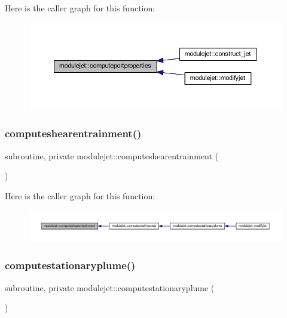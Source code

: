 Here is the caller graph for this function\+:\nopagebreak
\begin{figure}[H]
\begin{center}
\leavevmode
\includegraphics[width=350pt]{namespacemodulejet_a6a2424bc396ad0eed996ed0d75430e3b_icgraph}
\end{center}
\end{figure}
\mbox{\label{namespacemodulejet_a21b954c77f4addf0f268edc0e9448a18}} 
\subsubsection{\texorpdfstring{computeshearentrainment()}{computeshearentrainment()}}
{\footnotesize\ttfamily subroutine, private modulejet\+::computeshearentrainment (\begin{DoxyParamCaption}{ }\end{DoxyParamCaption})\hspace{0.3cm}{\ttfamily [private]}}

Here is the caller graph for this function\+:\nopagebreak
\begin{figure}[H]
\begin{center}
\leavevmode
\includegraphics[width=350pt]{namespacemodulejet_a21b954c77f4addf0f268edc0e9448a18_icgraph}
\end{center}
\end{figure}
\mbox{\label{namespacemodulejet_aa0e9555f7e9aa809220382ec3e33e9a5}} 
\subsubsection{\texorpdfstring{computestationaryplume()}{computestationaryplume()}}
{\footnotesize\ttfamily subroutine, private modulejet\+::computestationaryplume (\begin{DoxyParamCaption}{ }\end{DoxyParamCaption})\hspace{0.3cm}{\ttfamily [private]}}

